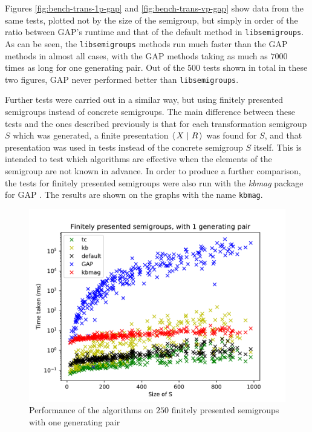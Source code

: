 Figures \ref{fig:bench-trans-1p-gap} and \ref{fig:bench-trans-vp-gap} show data
from the same tests, plotted not by
the size of the semigroup, but simply in order of the ratio between GAP's
runtime and that of the default method in \texttt{libsemigroups}.  As can be
seen, the \texttt{libsemigroups} methods run much faster than the GAP methods in
almost all cases, with the GAP methods taking as much as $7000$ times as long
for one generating pair.  Out of the $500$ tests shown in total in these two
figures, GAP never performed better than \texttt{libsemigroups}.

Further tests were carried out in a similar way, but using finitely presented
semigroups instead of concrete semigroups.  The main difference between these
tests and the ones described previously is that for each transformation
semigroup $S$ which was generated, a finite presentation $\left\langle\,X ~\middle|~ R\,\right\rangle$ was found
for $S$, and that presentation was used in tests instead of the concrete
semigroup $S$ itself.  This is intended to test which algorithms are effective
when the elements of the semigroup are not known in advance.
In order to produce a further comparison, the tests for finitely presented
semigroups were also run with the \textit{kbmag} package for GAP \cite{kbmag}.
The results are shown on the graphs with the name \texttt{kbmag}.

\begin{figure}[h]
  \centering
  \includegraphics[width=\textwidth]{pics/ch-pairs/bench-fp-1p-times}
  \caption{Performance of the algorithms on $250$ finitely presented semigroups
    with one generating pair}
  \label{fig:bench-fp-1p-times}
\end{figure}


